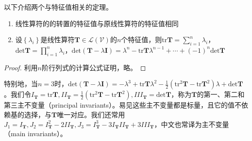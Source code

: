 \documentclass[main.tex]{subfiles}
\begin{document}
以下介绍两个与特征值相关的定理\cite[“性质1、性质2、p.~118]{周胜林2012线性代数}。

\begin{theorem}
\begin{enumerate}
    \item 线性算符的的转置的特征值与原线性算符的特征值相同
    \item 设$\left\{\lambda_i\right\}$是线性算符$\mathbf{T}\in\mathcal{L}\left(\mathcal{V}\right)$的$n$个特征值，则$\mathrm{tr}\mathbf{T}=\sum_{i=1}^n\lambda_i$，$\mathrm{det}\mathbf{T}=\prod_{i=1}^n\lambda_i$，$\mathrm{det}\left(\mathbf{T}-\lambda\mathbf{I}\right)=\lambda^n-\mathrm{tr}\mathbf{T}\lambda^{n-1}+\cdots+\left(-1\right)^n\mathrm{det}\mathbf{T}$
\end{enumerate}
\end{theorem}
\begin{proof}
利用$n$阶行列式的计算公式证明，略。
\end{proof}

特别地，当$n=3$时，$\mathrm{det}\left(\mathbf{T}-\lambda\mathbf{I}\right)=-\lambda^3+\mathrm{tr}\mathbf{T}\lambda^2-\frac{1}{2}\left(\mathrm{tr}^2\mathbf{T}-\mathrm{tr}\mathbf{T}^2\right)\lambda+\mathrm{det}\mathbf{T}$。我们令$I_\mathbf{T}=\mathrm{tr}\mathbf{T},II_\mathbf{T}=\frac{1}{2}\left(\mathrm{tr}^2\mathbf{T}-\mathrm{tr}\mathbf{T}^2\right),III_\mathbf{T}=\mathrm{det}\mathbf{T}$，称为$\mathbf{T}$的第一、第二和第三主不变量（principal invariants）。易见这些主不变量都是标量，且它的值不依赖基的选择，与$\mathbf{T}$唯一对应。我们还常用$J_1=I_\mathbf{T},J_2=I_\mathbf{T}^2-2II_\mathbf{T},J_3=I_\mathbf{T}^3-3I_\mathbf{T}II_\mathbf{T}+3III_\mathbf{T}$，中文也常译为主不变量（main invariants）。
\end{document}
